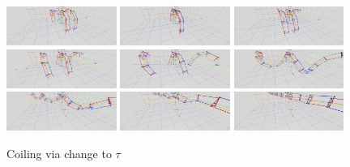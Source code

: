 \documentclass{svproc}
\begin{document}
\begin{figure}
  \centering

  \subcaptionbox{$\tau = -3.75 \degree$ }
{\includegraphics[width=0.32\textwidth]{figures/coiling/tau-375.png}}
\subcaptionbox{$\tau = 0 \degree$}
{\includegraphics[width=0.32\textwidth]{figures/coiling/tau0.png}}
\subcaptionbox{$\tau = 3.75 \degree$}
{\includegraphics[width=0.32\textwidth]{figures/coiling/tau375.png}}
  \subcaptionbox{$\tau = 7.5 \degree$ }
{\includegraphics[width=0.32\textwidth]{figures/coiling/tau75.png}}
  \subcaptionbox{$\tau = 15 \degree$ }
{\includegraphics[width=0.32\textwidth]{figures/coiling/tau15.png}}
\subcaptionbox{$\tau = 30 \degree$}
{\includegraphics[width=0.32\textwidth]{figures/coiling/tau30.png}}
\subcaptionbox{$\tau = 60 \degree$}
{\includegraphics[width=0.32\textwidth]{figures/coiling/tau60.png}}
\subcaptionbox{$\tau = 120 \degree$}
{\includegraphics[width=0.32\textwidth]{figures/coiling/tau120.png}}
\subcaptionbox{$\tau = 180 \degree$}
{\includegraphics[width=0.32\textwidth]{figures/coiling/tau180.png}}
\caption{Coiling via change to $\tau$}\label{fig:coiling}
\end{figure}
\end{document}
